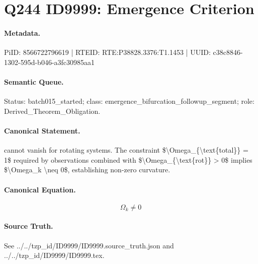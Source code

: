 \section*{Q244 ID9999: Emergence Criterion}
\paragraph{Metadata.}
PiID: 8566722796619 | RTEID: RTE:P38828.3376:T1.1453 | UUID: c38c8846-1302-595d-b046-a3fc30985aa1

\paragraph{Semantic Queue.}
Status: batch015\_started; class: emergence\_bifurcation\_followup\_segment; role: Derived\_Theorem\_Obligation.

\paragraph{Canonical Statement.}
cannot vanish for rotating systems. The constraint \$\textbackslash{}Omega\_\{\textbackslash{}text\{total\}\} = 1\$ required by observations combined with \$\textbackslash{}Omega\_\{\textbackslash{}text\{rot\}\} > 0\$ implies \$\textbackslash{}Omega\_k \textbackslash{}neq 0\$, establishing non-zero curvature.

\paragraph{Canonical Equation.}
\[
\Omega_k \neq 0
\]

\paragraph{Source Truth.}
See ../../tzp\_id/ID9999/ID9999.source\_truth.json and ../../tzp\_id/ID9999/ID9999.tex.
